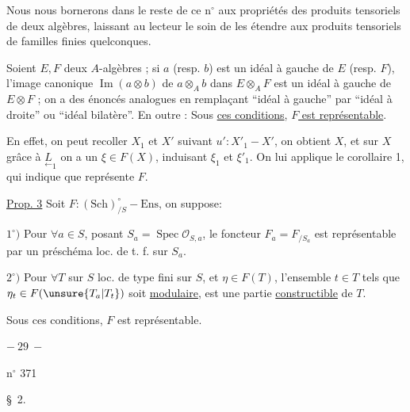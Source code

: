 Nous nous bornerons dans le reste de ce n$^\circ$ aux propriétés des produits tensoriels de deux algèbres, laissant au lecteur le soin de les étendre aux produits tensoriels de familles finies quelconques.

Soient $E,F$ deux $A$-algèbres ; si $a$ (resp. $b$) est un idéal à gauche de $E$ (resp. $F$), l'image canonique $\operatorname{Im}(a\otimes b)$ de $a\otimes_A b$ dans $E\otimes_A F$ est un idéal à gauche de $E\otimes F$ ; on a des énoncés analogues en remplaçant ``idéal à gauche'' par ``idéal à droite'' ou ``idéal bilatère''. En outre :
Sous \uline{ces conditions}, \uline{$F$ est représentable}.

En effet, on peut recoller $X_1$ et $X'$ suivant $u':X'_1\mathbin{-}X'$, on obtient $X$, et sur $X$ grâce à $\underset{\leftarrow}{L}_1$ on a un $\xi\in F(X)$, induisant $\xi_1$ et $\xi'_1$. On lui applique le corollaire 1, qui indique que   représente $F$.


\uline{Prop. 3} Soit $F:(\mathrm{Sch})_{/S}^{\circ}\mathbin{-}\mathrm{Ens}$, on suppose: 

$1^\circ)$ Pour $\forall a\in S$, posant $S_a=\operatorname{Spec}\mathcal O_{S,a}$, le foncteur $F_a=F_{/S_a}$ est représentable par un préschéma  loc. de t. f. sur $S_a$.

$2^\circ)$ Pour $\forall T$ sur $S$ loc. de type fini sur $S$, et $\eta\in F(T)$, l'ensemble  $t\in T$ tels que $\eta_t\in F(\unsure{T_a|T_t})$ soit  \uline{modulaire}, est une partie \uline{constructible} de $T$.

Sous ces conditions, $F$ est représentable.
\begin{center}$-\ 29\ -$\end{center}
\hfill n$^\circ$ 371

\begin{center}\S\ 2. \end{center}

